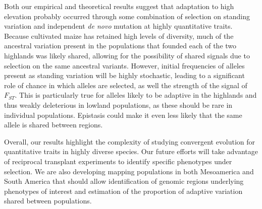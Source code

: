 {Both our empirical and theoretical results suggest that adaptation to high elevation probably occurred through some combination of selection on standing variation and independent \textit{de novo} mutation at highly quantitative traits. 
Because cultivated maize has retained high levels of diversity,
much of the ancestral variation present in the populations that founded each of the two highlands was likely shared,
allowing for the possibility of shared signals due to selection on the same ancestral variants.
However, initial frequencies of alleles present as standing variation will be highly stochastic,
leading to a significant role of chance in which alleles are selected,
as well the strength of the signal of $F_{ST}$.
This is particularly true for alleles likely to be adaptive in the highlands and thus weakly deleterious in lowland populations, as these should be rare in individual populations. 
Epistasis could make it even less likely that the same allele is shared between regions. 
}

{
Overall, our results highlight the complexity of studying convergent evolution for quantitative traits in highly diverse species. Our future efforts will take advantage of reciprocal transplant experiments to identify specific phenotypes under selection. We are also developing mapping populations in both Mesoamerica and South America that should allow identification of genomic regions underlying phenotypes of interest and estimation of the proportion of adaptive variation shared between populations.  }











